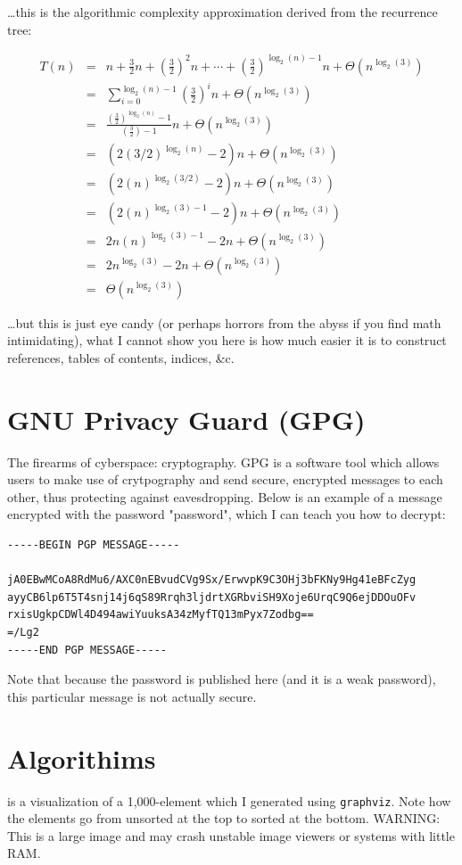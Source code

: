 \documentclass{article}
\begin{document}
\ldots this is the algorithmic complexity approximation derived from the recurrence tree:
\begin{center}
\begin{makeimage} %
\begin{eqnarray*}
	T(n) &=& n + \frac{3}{2}n + \left(\frac{3}{2}\right)^2n + \cdots + \left(\frac{3}{2}\right)^{\log_2(n) - 1}n + \Theta(n^{\log_2(3)}) \\
	&=& \sum_{i=0}^{\log_2(n)-1} \left(\frac{3}{2}\right)^in + \Theta(n^{\log_2(3)}) \\
	&=& \frac{\left(\frac{3}{2}\right)^{\log_2(n)} - 1}{\left(\frac{3}{2}\right) - 1}n + \Theta(n^{\log_2(3)}) \\
	&=& (2(3/2)^{\log_2(n)} - 2)n + \Theta(n^{\log_2(3)}) \\
	&=& (2(n)^{\log_2(3/2)} - 2)n + \Theta(n^{\log_2(3)}) \\
	&=& (2(n)^{\log_2(3) - 1} - 2)n + \Theta(n^{\log_2(3)}) \\
	&=& 2n(n)^{\log_2(3) - 1} - 2n + \Theta(n^{\log_2(3)}) \\
	&=& 2n^{\log_2(3)} - 2n + \Theta(n^{\log_2(3)}) \\
	&=& \Theta(n^{\log_2(3)})
\end{eqnarray*}
\end{makeimage}
\end{center}
\ldots but this is just eye candy (or perhaps horrors from the abyss if you find math intimidating), what I cannot show you here is how much easier it is to construct references, tables of contents, indices, \&c.

\section{GNU Privacy Guard (GPG)}
The firearms of cyberspace: cryptography.  GPG is a software tool which allows users to make use of crytpography and send secure, encrypted messages to each other, thus protecting against eavesdropping.  Below is an example of a message encrypted with the password "password", which I can teach you how to decrypt:
\begin{verbatim}
-----BEGIN PGP MESSAGE-----

jA0EBwMCoA8RdMu6/AXC0nEBvudCVg9Sx/ErwvpK9C3OHj3bFKNy9Hg41eBFcZyg
ayyCB6lp6T5T4snj14j6qS89Rrqh3ljdrtXGRbviSH9Xoje6UrqC9Q6ejDDOuOFv
rxisUgkpCDWl4D494awiYuuksA34zMyfTQ13mPyx7Zodbg==
=/Lg2
-----END PGP MESSAGE-----
\end{verbatim}
Note that because the password is published here (and it is a weak password), this particular message is not actually secure.

\section{Algorithims}
 is a visualization of a 1,000-element  which I generated using \texttt{graphviz}.  Note how the elements go from unsorted at the top to sorted at the bottom.  WARNING: This is a large image and may crash unstable image viewers or systems with little RAM.
\end{document}
